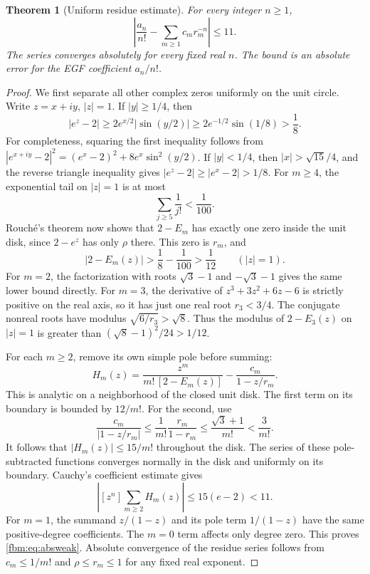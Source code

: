 \documentclass[11pt]{article}
\newtheorem{theorem}{Theorem}[section]
\theoremstyle{remark}\newtheorem{remark}[theorem]{Remark}
\newcommand{\abs}[1]{\left|#1\right|}
\begin{document}
\begin{theorem}[Uniform residue estimate]\label{fbm:thm:poles}
For every integer $n\geq1$,
\begin{equation}\label{fbm:eq:absweak}
 \abs{\frac{a_n}{n!}-\sum_{m\geq1}c_mr_m^{-n}}\leq11.
\end{equation}
The series converges absolutely for every fixed real $n$. The bound is an absolute error for the EGF coefficient $a_n/n!$.
\end{theorem}

\begin{proof}
We first separate all other complex zeros uniformly on the unit circle. Write $z=x+iy$, $|z|=1$. If $|y|\geq1/4$, then
\[
 |e^z-2|\geq2e^{x/2}|\sin(y/2)|
 \geq2e^{-1/2}\sin(1/8)>\frac18.
\]
For completeness, squaring the first inequality follows from
$|e^{x+iy}-2|^2=(e^x-2)^2+8e^x\sin^2(y/2)$.
If $|y|<1/4$, then $|x|>\sqrt{15}/4$, and the reverse triangle inequality gives
$|e^z-2|\geq|e^x-2|>1/8$.
For $m\geq4$, the exponential tail on $|z|=1$ is at most
\[
 \sum_{j\geq5}\frac1{j!}<\frac1{100}.
\]
Rouch\'e's theorem now shows that $2-E_m$ has exactly one zero inside the unit disk, since $2-e^z$ has only $\rho$ there. This zero is $r_m$, and
\begin{equation}\label{fbm:eq:circle}
 |2-E_m(z)|>\frac18-\frac1{100}>\frac1{12}\qquad(|z|=1).
\end{equation}
For $m=2$, the factorization with roots $\sqrt3-1$ and $-\sqrt3-1$ gives the same lower bound directly. For $m=3$, the derivative of $z^3+3z^2+6z-6$ is strictly positive on the real axis, so it has just one real root $r_3<3/4$. The conjugate nonreal roots have modulus $\sqrt{6/r_3}>\sqrt8$. Thus the modulus of $2-E_3(z)$ on $|z|=1$ is greater than $(\sqrt8-1)^2/24>1/12$.

For each $m\geq2$, remove its own simple pole before summing:
\[
 H_m(z)=\frac{z^m}{m!\,[2-E_m(z)]}-\frac{c_m}{1-z/r_m}.
\]
This is analytic on a neighborhood of the closed unit disk. The first term on its boundary is bounded by $12/m!$. For the second, use
\[
 \frac{c_m}{|1-z/r_m|}\leq\frac1{m!}\frac{r_m}{1-r_m}
 \leq\frac{\sqrt3+1}{m!}<\frac3{m!}.
\]
It follows that $|H_m(z)|\leq15/m!$ throughout the disk. The series of these pole-subtracted functions converges normally in the disk and uniformly on its boundary. Cauchy's coefficient estimate gives
\[
 \abs{[z^n]\sum_{m\geq2}H_m(z)}\leq15(e-2)<11.
\]
For $m=1$, the summand $z/(1-z)$ and its pole term $1/(1-z)$ have the same positive-degree coefficients. The $m=0$ term affects only degree zero. This proves \eqref{fbm:eq:absweak}. Absolute convergence of the residue series follows from $c_m\leq1/m!$ and $\rho\leq r_m\leq1$ for any fixed real exponent.
\end{proof}
\end{document}
